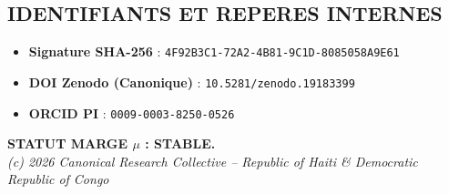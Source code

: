 ﻿\documentclass[a4paper,12pt]{article}
\begin{document}
\bigskip



\begin{tcolorbox}[colback=white,colframe=black!75!white]

\section*{IDENTIFIANTS ET REPERES INTERNES}

\begin{itemize}

    \item \textbf{Signature SHA-256} : \texttt{4F92B3C1-72A2-4B81-9C1D-8085058A9E61}

    \item \textbf{DOI Zenodo (Canonique)} : \texttt{10.5281/zenodo.19183399}

    \item \textbf{ORCID PI} : \texttt{0009-0003-8250-0526}

\end{itemize}

\end{tcolorbox}



\vfill

\centering

\textbf{STATUT MARGE $\mu$ : STABLE.} \\

\textit{(c) 2026 Canonical Research Collective -- Republic of Haiti \& Democratic Republic of Congo}
\end{document}
